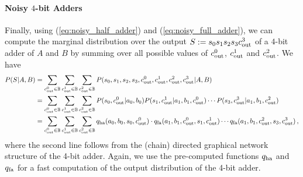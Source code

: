 \paragraph{Noisy $4$-bit Adders} Finally, using (\ref{eq:noisy_half_adder}) and (\ref{eq:noisy_full_adder}), we can compute the marginal distribution over the output $S:=s_0s_1s_2s_3c_{\mathrm{out}}^3$ of a $4$-bit adder of $A$ and $B$ by summing over all possible values of $c_{\mathrm{out}}^0$, $c_{\mathrm{out}}^1$ and $c_{\mathrm{out}}^2$. We have
\begin{align}
    P(S|A,B) & = \sum_{c_{\mathrm{out}}^0 \in \mathbb{B}} \sum_{c_{\mathrm{out}}^1\in\mathbb{B}} \sum_{c_{\mathrm{out}}^2\in\mathbb{B}} P(s_0,s_1,s_2,s_3,c_{\mathrm{out}}^0,c_{\mathrm{out}}^1,c_{\mathrm{out}}^2,c_{\mathrm{out}}^3|A,B) \nonumber                                                          \\
             & = \sum_{c_{\mathrm{out}}^0 \in \mathbb{B}} \sum_{c_{\mathrm{out}}^1\in\mathbb{B}} \sum_{c_{\mathrm{out}}^2\in\mathbb{B}} P(s_0,c_{\mathrm{out}}^0|a_0,b_0)P(s_1,c_{\mathrm{out}}^1|a_1,b_1,c_{\mathrm{out}}^0)\cdots P(s_3,c_{\mathrm{out}}^3|a_1,b_1,c_{\mathrm{out}}^2) \nonumber                       \\
             & = \sum_{c_{\mathrm{out}}^0 \in \mathbb{B}} \sum_{c_{\mathrm{out}}^1\in\mathbb{B}} \sum_{c_{\mathrm{out}}^2\in\mathbb{B}} q_{\mathrm{ha}}(a_0,b_0,s_0,c_{\mathrm{out}}^0)\cdot q_{\mathrm{fa}}(a_1,b_1,c_{\mathrm{out}}^0,s_1,c_{\mathrm{out}}^1)\cdots q_{\mathrm{fa}}(a_1,b_1,c_{\mathrm{out}}^2,s_3,c_{\mathrm{out}}^3) \nonumber \,,
\end{align}
where the second line follows from the (chain) directed graphical network structure of the 4-bit adder. Again, we use the  pre-computed functions $q_{\mathrm{ha}}$ and $q_{\mathrm{fa}}$ for a fast computation of the output distribution of the 4-bit adder.

